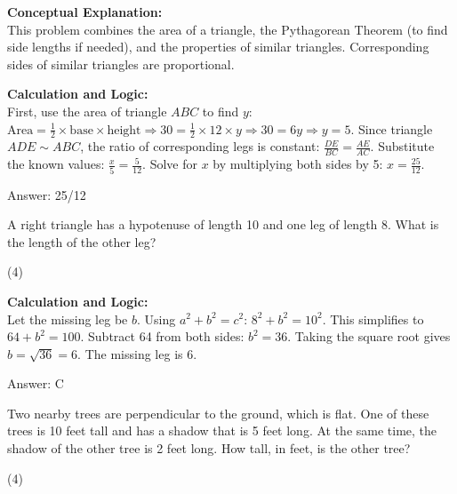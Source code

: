 \documentclass[11pt,paper=a4,answers]{exam}
\begin{document}
\begin{questions}
\begin{solution}
\textbf{Conceptual Explanation:} \\
This problem combines the area of a triangle, the Pythagorean Theorem (to find side lengths if needed), and the properties of similar triangles. Corresponding sides of similar triangles are proportional.

\vspace{30pt}

\textbf{Calculation and Logic:} \\
First, use the area of triangle $ABC$ to find $y$: $\text{Area} = \frac{1}{2} \times \text{base} \times \text{height} \Rightarrow 30 = \frac{1}{2} \times 12 \times y \Rightarrow 30 = 6y \Rightarrow y = 5$. Since triangle $ADE \sim ABC$, the ratio of corresponding legs is constant: $\frac{DE}{BC} = \frac{AE}{AC}$. Substitute the known values: $\frac{x}{5} = \frac{5}{12}$. Solve for $x$ by multiplying both sides by 5: $x = \frac{25}{12}$. 

\vspace{30pt}

Answer: \colorbox{yellow!100}{25/12}
\end{solution}

\vspace{60pt}

\question
A right triangle has a hypotenuse of length 10 and one leg of length 8. What is the length of the other leg?
\begin{tasks}(4)
\end{tasks}

\begin{solution}
\textbf{Calculation and Logic:} \\
Let the missing leg be $b$. Using $a^2 + b^2 = c^2$: $8^2 + b^2 = 10^2$. This simplifies to $64 + b^2 = 100$. Subtract 64 from both sides: $b^2 = 36$. Taking the square root gives $b = \sqrt{36} = 6$. The missing leg is 6.

\vspace{30pt}

Answer: \colorbox{yellow!100}{C}
\end{solution}

\vspace{60pt}

\question
Two nearby trees are perpendicular to the ground, which is flat. One of these trees is 10 feet tall and has a shadow that is 5 feet long. At the same time, the shadow of the other tree is 2 feet long. How tall, in feet, is the other tree?
\begin{tasks}(4)
\end{tasks}


\end{questions}
\end{document}
